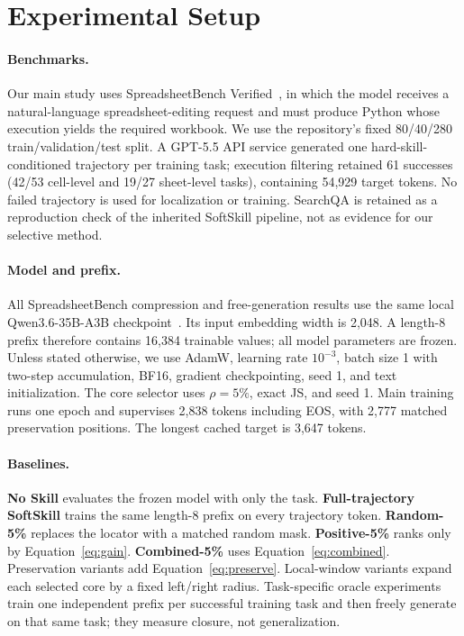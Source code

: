 \section{Experimental Setup}
\label{sec:setup}

\paragraph{Benchmarks.}
Our main study uses SpreadsheetBench Verified~\citep{ma2024spreadsheetbench}, in which the model receives a natural-language spreadsheet-editing request and must produce Python whose execution yields the required workbook.  We use the repository's fixed 80/40/280 train/validation/test split.  A GPT-5.5 API service generated one hard-skill-conditioned trajectory per training task; execution filtering retained 61 successes (42/53 cell-level and 19/27 sheet-level tasks), containing 54,929 target tokens.  No failed trajectory is used for localization or training.  SearchQA is retained as a reproduction check of the inherited SoftSkill pipeline, not as evidence for our selective method.

\paragraph{Model and prefix.}
All SpreadsheetBench compression and free-generation results use the same local Qwen3.6-35B-A3B checkpoint~\citep{qwen2026qwen36}.  Its input embedding width is 2,048.  A length-8 prefix therefore contains 16,384 trainable values; all model parameters are frozen.  Unless stated otherwise, we use AdamW, learning rate $10^{-3}$, batch size 1 with two-step accumulation, BF16, gradient checkpointing, seed 1, and text initialization.  The core selector uses $\rho=5\%$, exact JS, and seed 1.  Main training runs one epoch and supervises 2,838 tokens including EOS, with 2,777 matched preservation positions.  The longest cached target is 3,647 tokens.

\paragraph{Baselines.}
\textbf{No Skill} evaluates the frozen model with only the task.  \textbf{Full-trajectory SoftSkill} trains the same length-8 prefix on every trajectory token.  \textbf{Random-5\%} replaces the locator with a matched random mask.  \textbf{Positive-5\%} ranks only by Equation~\ref{eq:gain}.  \textbf{Combined-5\%} uses Equation~\ref{eq:combined}.  Preservation variants add Equation~\ref{eq:preserve}.  Local-window variants expand each selected core by a fixed left/right radius.  Task-specific oracle experiments train one independent prefix per successful training task and then freely generate on that same task; they measure closure, not generalization.

